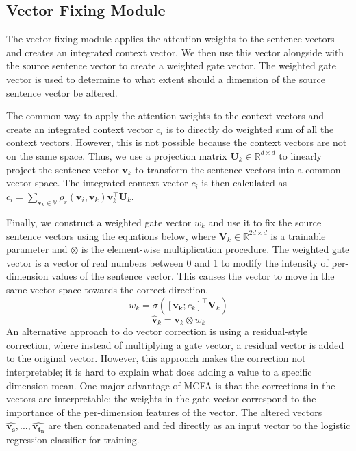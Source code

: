 \documentclass{article}
\begin{document}
\subsection{Vector Fixing Module}

The vector fixing module applies the attention weights to the sentence vectors and creates an integrated context vector. We then use this vector alongside with the source sentence vector to create a weighted gate vector. The weighted gate vector is used to determine to what extent should a dimension of the source sentence vector be altered.

The common way to apply the attention weights to the context vectors and create an integrated context vector $c_i$ is to directly do weighted sum of all the context vectors.
However, this is not possible because the context vectors are not on the same space. Thus, we use a projection matrix $\mathbf{U}_k \in \mathbb{R}^{d \times d}$ to linearly project the sentence vector $\mathbf{v}_k$ to transform the sentence vectors into a common vector space. The integrated context vector $c_i$ is then calculated as
$c_i = \sum_{\mathbf{v}_k \in \mathbb{V}} \rho_r(\mathbf{v}_i, \mathbf{v}_k) \mathbf{v}_k^\top \mathbf{U}_k$.

Finally, we construct a weighted gate vector $w_k$ and use it to fix the source sentence vectors using the equations below, where $\mathbf{V}_k \in \mathbb{R}^{2d \times d}$ is a trainable parameter and $\otimes$ is the element-wise multiplication procedure. The weighted gate vector is a vector of real numbers between 0 and 1 to modify the intensity of per-dimension values of the sentence vector.
This causes the vector to move in the same vector space towards the correct direction.
\begin{equation}
    w_k = \sigma([\mathbf{v_k}; c_k]^\top \mathbf{V}_k)
\end{equation}
\begin{equation}
    \hat{\mathbf{v}}_k = \mathbf{v}_k \otimes w_k
\end{equation}
An alternative approach to do vector correction is using a residual-style correction, where instead of multiplying a gate vector, a residual vector \cite{he2016deep} is added to the original vector. However, this approach makes the correction not interpretable; it is hard to explain what does adding a value to a specific dimension mean.
One major advantage of MCFA is that the corrections in the vectors are interpretable; the weights in the gate vector correspond to the importance of the per-dimension features of the vector.
The altered vectors $\hat{\mathbf{v_s}}, ..., \hat{\mathbf{v_{t_n}}}$ are then concatenated and fed directly as an input vector to the logistic regression classifier for training.
\end{document}
